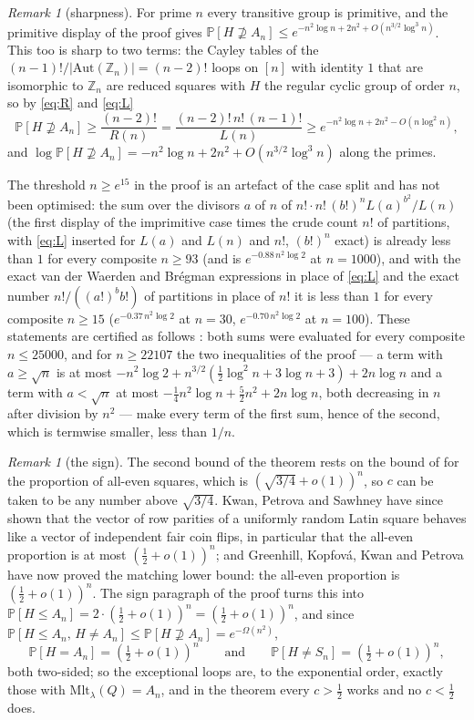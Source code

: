 \documentclass[11pt]{amsart}
\theoremstyle{plain}
\theoremstyle{remark}
\newtheorem{remark}[theorem]{Remark}
\newcommand{\Mlt}{\mathrm{Mlt}}
\renewcommand{\Pr}{\mathbb{P}}
\begin{document}
\begin{remark}[sharpness]
For prime $n$ every transitive group is primitive, and the primitive
display of the proof gives
$\Pr[H\not\supseteq A_n]\le e^{-n^2\log n+2n^2+O(n^{3/2}\log^3n)}$.
This too is sharp to two terms: the Cayley tables of the
$(n-1)!/|\mathrm{Aut}(\mathbb Z_n)|=(n-2)!$ loops on $[n]$ with identity
$1$ that are isomorphic to $\mathbb Z_n$ are reduced squares with $H$ the
regular cyclic group of order $n$, so by \eqref{eq:R} and \eqref{eq:L}
\[
\Pr[H\not\supseteq A_n]\ge\frac{(n-2)!}{R(n)}=\frac{(n-2)!\,n!\,(n-1)!}{L(n)}
\ge e^{-n^2\log n+2n^2-O(n\log^2n)},
\]
and $\log\Pr[H\not\supseteq A_n]=-n^2\log n+2n^2+O(n^{3/2}\log^3n)$
along the primes.

The threshold $n\ge e^{15}$ in the proof is an artefact of the case
split and has not been optimised: the sum over the divisors $a$ of $n$
of $n!\cdot n!\,(b!)^nL(a)^{b^2}/L(n)$ (the first display of the
imprimitive case times the crude count $n!$ of partitions, with
\eqref{eq:L} inserted for $L(a)$ and $L(n)$ and $n!$, $(b!)^n$ exact)
is already less than $1$ for every composite $n\ge93$ (and is
$e^{-0.88\,n^2\log2}$ at $n=1000$), and with the exact van der
Waerden and Br\'egman expressions in place of \eqref{eq:L} and the
exact number $n!/((a!)^bb!)$ of partitions in place of $n!$ it is less
than $1$ for every composite $n\ge15$ ($e^{-0.37\,n^2\log2}$ at
$n=30$, $e^{-0.70\,n^2\log2}$ at $n=100$).  These statements are
certified as follows \cite{repo}: both sums were evaluated for every
composite $n\le25000$, and for $n\ge22107$ the two inequalities of the
proof --- a term with $a\ge\sqrt n$ is at most
$-n^2\log2+n^{3/2}(\frac12\log^2n+3\log n+3)+2n\log n$ and a term with
$a<\sqrt n$ at most $-\frac14n^2\log n+\frac52n^2+2n\log n$, both
decreasing in $n$ after division by $n^2$ --- make every term of the
first sum, hence of the second, which is termwise smaller, less than
$1/n$.
\end{remark}

\begin{remark}[the sign]\label{rem:sign}
The second bound of the theorem rests on the bound of \cite{HJ96} for
the proportion of all-even squares, which is $(\sqrt{3/4}+o(1))^n$, so
$c$ can be taken to be any number above $\sqrt{3/4}$.  Kwan, Petrova
and Sawhney \cite{KPS25} have since shown that the vector of row
parities of a uniformly random Latin square behaves like a vector of
independent fair coin flips, in particular that the all-even proportion
is at most $(\frac12+o(1))^n$; and Greenhill, Kopfov\'a, Kwan and
Petrova \cite{GKKP26} have now proved the matching lower
bound: the all-even proportion is $(\frac12+o(1))^n$.  The sign
paragraph of the proof turns this into
$\Pr[H\le A_n]=2\cdot(\frac12+o(1))^n=(\frac12+o(1))^n$, and since
$\Pr[H\le A_n,\,H\ne A_n]\le\Pr[H\not\supseteq A_n]=e^{-\Omega(n^2)}$,
\[
\Pr[H=A_n]=(\tfrac12+o(1))^n\qquad\text{and}\qquad\Pr[H\ne S_n]=(\tfrac12+o(1))^n,
\]
both two-sided; so the exceptional loops are, to the exponential
order, exactly those with $\Mlt_\lambda(Q)=A_n$, and in the theorem
every $c>\frac12$ works and no $c<\frac12$ does.
\end{remark}
\end{document}
